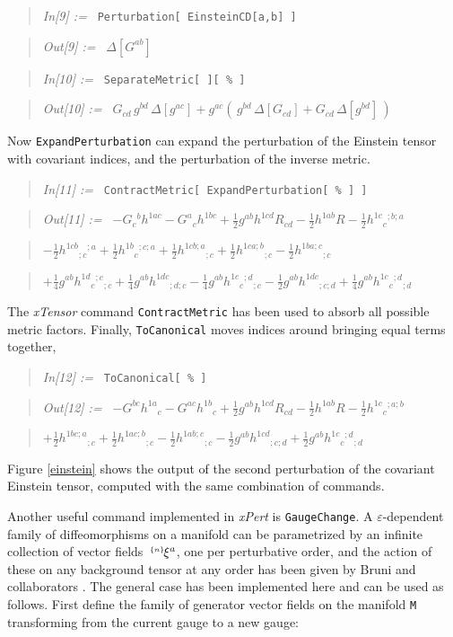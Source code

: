 \documentclass[aps,prd,showpacs]{revtex4}
\newcommand{\xPert}{{\em \lowercase{x}P\lowercase{ert}}}
\newcommand{\pert}[2]{{}^{\mbox{\,\tiny $\{#1\}\!$}}{#2}}
\newcommand{\mathIn}[2]{
    \begin{quotation} {\em In[#1] :=\ } {\tt #2} \end{quotation}
}
\newcommand{\mathOut}[2]{
    \begin{quotation} {\em Out[#1] :=\ } #2 \end{quotation}
}
\newcommand{\mathComment}[1]{
    \begin{quotation} \qquad\qquad #1 \end{quotation} 
}
\begin{document}
\mathIn{9}{Perturbation[ EinsteinCD[a,b] ]}
\mathOut{9}{$\Delta[G^{ab}]$}

\mathIn{10}{SeparateMetric[ ][ \% ]}
\mathOut{10}{$G_{cd}\,g^{bd}\,\Delta[g^{ac}] +
    g^{ac}\left(\,g^{bd}\,\Delta[G_{cd}]+G_{cd}\,\Delta[g^{bd}]\,\right)$}

\noindent Now {\tt ExpandPerturbation} can expand the perturbation of
the Einstein tensor with covariant indices, and the perturbation of the
inverse metric.

\mathIn{11}{ContractMetric[ ExpandPerturbation[ \% ] ]}
\mathOut{11}{$-G_c{}^bh^{1ac}
            -G^a{}_ch^{1bc}
            +\frac{1}{2}g^{ab}h^{1cd}R_{cd}
            -\frac{1}{2}h^{1ab}R
            -\frac{1}{2}h^{1c}{}_c{}^{;b;a}$}
\mathComment{$-\frac{1}{2}h^{1cb}{}_{;c}{}^{;a}
            +\frac{1}{2}h^{1b}{}_c{}^{;c;a}
            +\frac{1}{2}h^{1cb;a}{}_{;c}
            +\frac{1}{2}h^{1ca;b}{}_{;c}
            -\frac{1}{2}h^{1ba;c}{}_{;c}$}
\mathComment{$+\frac{1}{4}g^{ab}h^{1d}{}_c{}^{;c}{}_{;c}
            +\frac{1}{4}g^{ab}h^{1dc}{}_{;d;c}
            -\frac{1}{4}g^{ab}h^{1c}{}_c{}^{;d}{}_{;c}
            -\frac{1}{2}g^{ab}h^{1dc}{}_{;c;d}
            +\frac{1}{4}g^{ab}h^{1c}{}_c{}^{;d}{}_{;d}$}

\noindent The {\em xTensor} command {\tt ContractMetric} has been used
to absorb all possible metric factors. Finally, {\tt ToCanonical}
moves indices around bringing equal terms together,

\mathIn{12}{ToCanonical[ \% ]}
\mathOut{12}{$-G^{bc}h^{1a}{}_c
            -G^{ac}h^{1b}{}_c
            +\frac{1}{2}g^{ab}h^{1cd}R_{cd}
            -\frac{1}{2}h^{1ab}R
            -\frac{1}{2}h^{1c}{}_c{}^{;a;b}$}
\mathComment{$+\frac{1}{2}h^{1bc;a}{}_{;c}
            +\frac{1}{2}h^{1ac;b}{}_{;c}
            -\frac{1}{2}h^{1ab;c}{}_{;c}
            -\frac{1}{2}g^{ab}h^{1cd}{}_{;c;d}
            +\frac{1}{2}g^{ab}h^{1c}{}_c{}^{;d}{}_{;d}$}

\noindent Figure \ref{einstein} shows the output of the second perturbation
of the covariant Einstein tensor, computed with the same combination of
commands.

Another useful command implemented in \xPert\/ is {\tt GaugeChange}.
A $\varepsilon$-dependent family of diffeomorphisms on a manifold
can be parametrized by an infinite collection of vector fields
$\pert{n}{\xi}^a$, one per perturbative order, and the action of
these on any background tensor at any order has been given by Bruni
and collaborators \cite{BMM97}. The general case has been implemented
here and can be used as follows. First define the family of generator
vector fields on the manifold {\tt M} transforming from the current
gauge to a new gauge:
\end{document}
